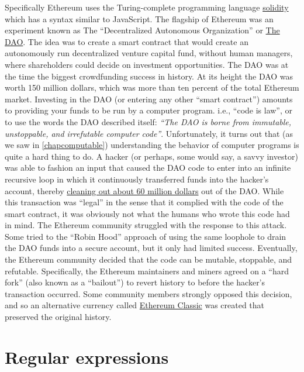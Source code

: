\begin{example}
Specifically Ethereum uses the Turing-complete programming language
\href{https://solidity.readthedocs.io/en/develop/index.html}{solidity}
which has a syntax similar to JavaScript. The flagship of Ethereum was
an experiment known as The ``Decentralized Autonomous Organization'' or
\href{https://goo.gl/NegW77}{The DAO}. The idea was to create a smart
contract that would create an autonomously run decentralized venture
capital fund, without human managers, where shareholders could decide on
investment opportunities. The DAO was at the time the biggest
crowdfunding success in history. At its height the DAO was worth 150
million dollars, which was more than ten percent of the total Ethereum
market. Investing in the DAO (or entering any other ``smart contract'')
amounts to providing your funds to be run by a computer program. i.e.,
``code is law'', or to use the words the DAO described itself:
\emph{``The DAO is borne from immutable, unstoppable, and irrefutable
computer code''}. Unfortunately, it turns out that (as we saw in
\cref{chapcomputable}) understanding the behavior of computer programs
is quite a hard thing to do. A hacker (or perhaps, some would say, a
savvy investor) was able to fashion an input that caused the DAO code to
enter into an infinite recursive loop in which it continuously
transferred funds into the hacker's account, thereby
\href{https://www.bloomberg.com/features/2017-the-ether-thief/}{cleaning
out about 60 million dollars} out of the DAO. While this transaction was
``legal'' in the sense that it complied with the code of the smart
contract, it was obviously not what the humans who wrote this code had
in mind. The Ethereum community struggled with the response to this
attack. Some tried to the ``Robin Hood'' approach of using the same
loophole to drain the DAO funds into a secure account, but it only had
limited success. Eventually, the Ethereum community decided that the
code can be mutable, stoppable, and refutable. Specifically, the
Ethereum maintainers and miners agreed on a ``hard fork'' (also known as
a ``bailout'') to revert history to before the hacker's transaction
occurred. Some community members strongly opposed this decision, and so
an alternative currency called
\href{https://ethereumclassic.github.io/}{Ethereum Classic} was created
that preserved the original history.

\end{example}

\section{Regular expressions}\label{Regular-expressions}

